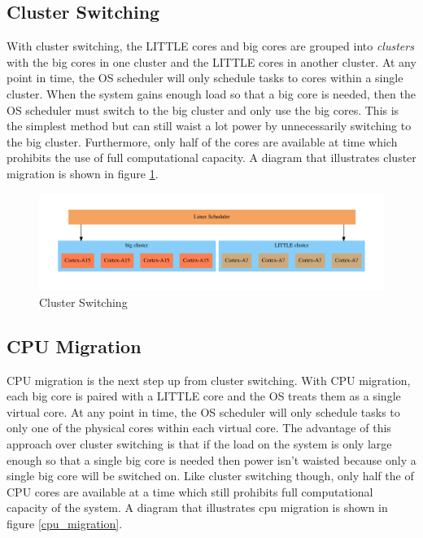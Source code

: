 \documentclass[11pt]{book}
\begin{document}
\subsection{Cluster Switching}

With cluster switching, the LITTLE cores and big cores are grouped into \emph{clusters} with
the big cores in one cluster and the LITTLE cores in another cluster. At any point in time,
the OS scheduler will only schedule tasks to cores within a single cluster. When the system
gains enough load so that a big core is needed, then the OS scheduler must switch to the big
cluster and only use the big cores. This is the simplest method but can still waist a lot
power by unnecessarily switching to the big cluster. Furthermore, only half of the cores are
available at time which prohibits the use of full computational capacity. A diagram that
illustrates cluster migration is shown in figure \ref{cluster_switching}.

\begin{figure}[H]
    \centering
    \includegraphics[width=\textwidth]{figs/graphviz/cluster_switching.pdf}
    \caption{Cluster Switching}\label{cluster_switching}
\end{figure}

\subsection{CPU Migration}

CPU migration is the next step up from cluster switching. With CPU migration, each big
core is paired with a LITTLE core and the OS treats them as a single virtual core. At any
point in time, the OS scheduler will only schedule tasks to only one of the physical cores
within each virtual core. The advantage of this approach over cluster switching is that if
the load on the system is only large enough so that a single big core is needed then power
isn't waisted because only a single big core will be switched on. Like cluster switching
though, only half the of CPU cores are available at a time which still prohibits full
computational capacity of the system. A diagram that illustrates cpu migration is shown in
figure \ref{cpu_migration}.
\end{document}
